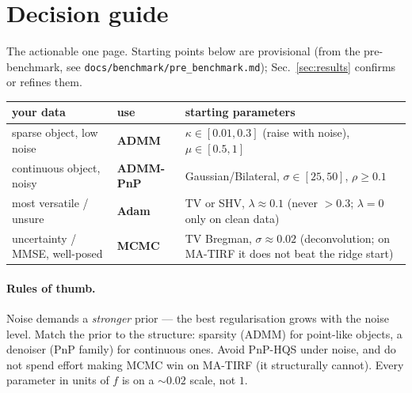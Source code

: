 \section{Decision guide}
\label{sec:decision}

The actionable one page. Starting points below are provisional (from the pre-benchmark, see
\texttt{docs/benchmark/pre\_benchmark.md}); Sec.~\ref{sec:results} confirms or refines them.

\begin{center}
\begin{tabular}{p{4.3cm}p{3.0cm}p{5.6cm}}
\toprule
your data & use & starting parameters \\
\midrule
sparse object, low noise & \textbf{ADMM} & $\kappa \in [0.01, 0.3]$ (raise with noise),
                          $\mu \in [0.5, 1]$ \\
continuous object, noisy & \textbf{ADMM-PnP} & Gaussian/Bilateral, $\sigma \in [25, 50]$,
                          $\rho \ge 0.1$ \\
most versatile / unsure & \textbf{Adam} & TV or SHV, $\lambda \approx 0.1$ (never $>0.3$;
                          $\lambda=0$ only on clean data) \\
uncertainty / MMSE, well-posed & \textbf{MCMC} & TV Bregman, $\sigma \approx 0.02$
                          (deconvolution; on MA-TIRF it does not beat the ridge start) \\
\bottomrule
\end{tabular}
\end{center}

\paragraph{Rules of thumb.}
Noise demands a \emph{stronger} prior --- the best regularisation grows with the noise level.
Match the prior to the structure: sparsity (ADMM) for point-like objects, a denoiser (PnP family)
for continuous ones. Avoid PnP-HQS under noise, and do not spend effort making MCMC win on
MA-TIRF (it structurally cannot). Every parameter in units of $f$ is on a ${\sim}0.02$ scale, not
$1$.
